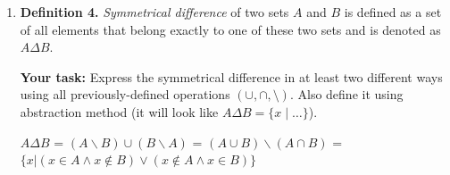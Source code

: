 \documentclass[12pt]{article}
\begin{document}
\begin{enumerate}
RHS2.

Let $\Phi x \in ((A \backslash B) \cup (A \backslash C))$. Then $(x \in A \land x \not\in B) \lor (x \in A \land x \not\in C)$ \Rightarrow $x \in A \land (x \not\in B \lor x \not\in C)$ \Rightarrow $x \in A \land x \not\in (B \cap C)$ \Rightarrow $x \in (A \backslash (B \cap C))$. Proven

Then statement $A \setminus (B \cap C) &= (A \setminus B) \cup (A \setminus C)$ also holds.


\item \textbf{Definition 4.} \textit{Symmetrical difference} of two sets \(A\) and \(B\) is defined as a set of all elements that belong exactly to one of these two sets and is denoted as \(A \Delta B\).

\textbf{Your task:} Express the symmetrical difference in at least two different ways using all previously-defined operations \((\cup, \cap, \setminus)\). Also define it using abstraction method (it will look like \(A \Delta B = \{x \mid \dots \}\)).

$A \Delta B$ = $(A\backslash B) \cup (B \backslash A)$ = $(A \cup B)\backslash (A \cap B)$ = $\{x | (x \in A \land x \not\in B) \lor (x \not\in A \land x \in B)\}$


\end{enumerate}
\end{document}
